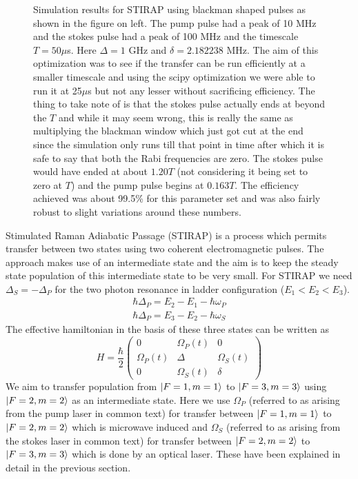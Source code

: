 \documentclass[%
 reprint,
 amsmath,amssymb,
 aps,
]{revtex4-2}
\begin{document}
\begin{figure}[ht]
    \caption{Simulation results for STIRAP using blackman shaped pulses as shown in the figure on left. The pump pulse had a peak of 10 MHz and the stokes pulse had a peak of 100 MHz and the timescale $T = 50\mu$s. Here $\Delta = 1$ GHz and $\delta = 2.182238$ MHz. The aim of this optimization was to see if the transfer can be run efficiently at a smaller timescale and using the scipy optimization we were able to run it at 25$\mu$s but not any lesser without sacrificing efficiency. The thing to take note of is that the stokes pulse actually ends at beyond the $T$ and while it may seem wrong, this is really the same as multiplying the blackman window which just got cut at the end since the simulation only runs till that point in time after which it is safe to say that both the Rabi frequencies are zero. The stokes pulse would have ended at about $1.20T$ (not considering it being set to zero at $T$) and the pump pulse begins at $0.163T$. The efficiency achieved was about 99.5\% for this parameter set and was also fairly robust to slight variations around these numbers.}
\end{figure}
Stimulated Raman Adiabatic Passage (STIRAP) is a process which permits transfer between two states using two coherent electromagnetic pulses. The approach makes use of an intermediate state and the aim is to keep the steady state population of this intermediate state to be very small. For STIRAP \cite{73.043415} we need $\Delta_S = -\Delta_P$ for the two photon resonance in ladder configuration ($E_1<E_2<E_3$).
\begin{gather}\hbar\Delta_P = E_2 - E_1 - \hbar\omega_P\\
\hbar\Delta_P = E_3 - E_2 - \hbar\omega_S\end{gather}
The effective hamiltonian in the basis of these three states can be written as
\begin{equation}H = \dfrac{\hbar}{2}
\begin{pmatrix}0 & \Omega_P(t) & 0\\
               \Omega_P(t) & \Delta & \Omega_S(t)\\
               0 & \Omega_S(t) & \delta\end{pmatrix}
\end{equation}
We aim to transfer population from $\ket{F=1,m=1}$ to $\ket{F=3,m=3}$ using $\ket{F=2,m=2}$ as an intermediate state. Here we use $\Omega_P$ (referred to as arising from the pump laser in common text) for transfer between $\ket{F=1,m=1}$ to $\ket{F=2,m=2}$ which is microwave induced and $\Omega_S$ (referred to as arising from the stokes laser in common text) for transfer between $\ket{F=2,m=2}$ to $\ket{F=3,m=3}$ which is done by an optical laser. These have been explained in detail in the previous section.\\
\end{document}
